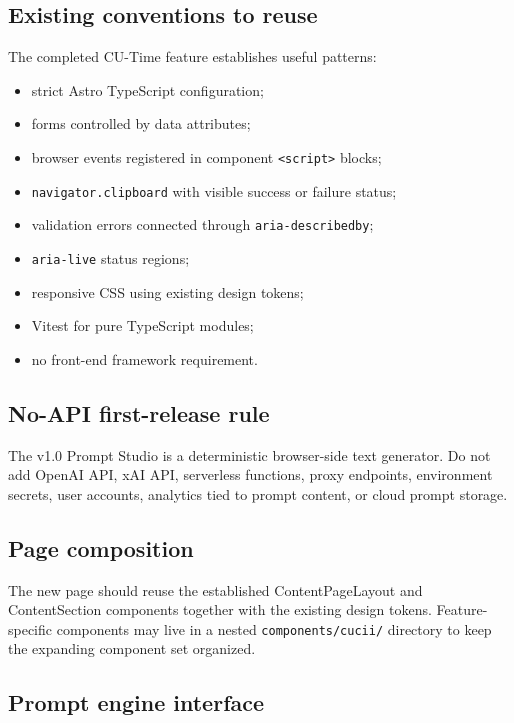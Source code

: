 \documentclass[11pt,letterpaper]{article}
\newcommand{\filepath}[1]{\texttt{#1}}
\begin{document}
\subsection{Existing conventions to reuse}

The completed CU-Time feature establishes useful patterns:

\begin{itemize}
    \item strict Astro TypeScript configuration;
    \item forms controlled by data attributes;
    \item browser events registered in component \texttt{<script>} blocks;
    \item \texttt{navigator.clipboard} with visible success or failure status;
    \item validation errors connected through \texttt{aria-describedby};
    \item \texttt{aria-live} status regions;
    \item responsive CSS using existing design tokens;
    \item Vitest for pure TypeScript modules;
    \item no front-end framework requirement.
\end{itemize}

\subsection{No-API first-release rule}

\begin{safetybox}
The v1.0 Prompt Studio is a deterministic browser-side text generator. Do not add
OpenAI API, xAI API, serverless functions, proxy endpoints, environment secrets,
user accounts, analytics tied to prompt content, or cloud prompt storage.
\end{safetybox}

\subsection{Page composition}

The new page should reuse the established ContentPageLayout and ContentSection
components together with the existing design tokens. Feature-specific components
may live in a nested \filepath{components/cucii/} directory to keep the expanding
component set organized.

\subsection{Prompt engine interface}
\end{document}
